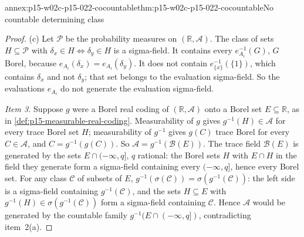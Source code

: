 \begin{annexitem}{annex:p15-w02c-p15-022-cocountable}{thm:p15-w02c-p15-022-cocountable}{No countable determining class}
\begin{proof}
(c) Let \(\mathscr P\) be the probability measures on
\((\mathbb R,\mathcal A)\). The class of sets \(H\subseteq\mathscr P\)
with \(\delta_x\in H\Leftrightarrow\delta_y\in H\) is a sigma-field. It
contains every \(e_{A_i}^{-1}(G)\), \(G\) Borel, because
\(e_{A_i}(\delta_x)=e_{A_i}(\delta_y)\). It does not contain
\(e_{\{x\}}^{-1}(\{1\})\), which contains \(\delta_x\) and not
\(\delta_y\); that set belongs to the evaluation sigma-field. So the
evaluations \(e_{A_i}\) do not generate the evaluation sigma-field.

\emph{Item 3.} Suppose \(g\) were a Borel real coding of
\((\mathbb R,\mathcal A)\) onto a Borel set \(E\subseteq\mathbb R\), as in
\cref{def:p15-measurable-real-coding}. Measurability of \(g\) gives
\(g^{-1}(H)\in\mathcal A\) for every trace Borel set \(H\); measurability
of \(g^{-1}\) gives \(g(C)\) trace Borel for every \(C\in\mathcal A\), and
\(C=g^{-1}(g(C))\). So \(\mathcal A=g^{-1}(\mathcal B(E))\). The trace
field \(\mathcal B(E)\) is generated by the sets
\(E\cap(-\infty,q]\), \(q\) rational: the Borel sets \(H\) with
\(E\cap H\) in the field they generate form a sigma-field containing every
\((-\infty,q]\), hence every Borel set. For any class \(\mathcal C\) of
subsets of \(E\), \(g^{-1}(\sigma(\mathcal C))=\sigma(g^{-1}(\mathcal C))\):
the left side is a sigma-field containing \(g^{-1}(\mathcal C)\), and the
sets \(H\subseteq E\) with \(g^{-1}(H)\in\sigma(g^{-1}(\mathcal C))\)
form a sigma-field containing \(\mathcal C\). Hence \(\mathcal A\) would be
generated by the countable family \(g^{-1}(E\cap(-\infty,q])\),
contradicting item~2(a).
\end{proof}
\end{annexitem}

